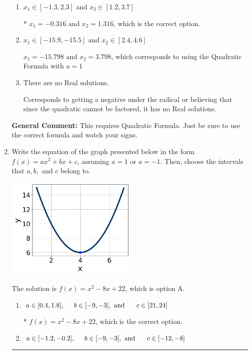 \documentclass{extbook}[14pt]
\newcommand{\litem}[1]{\item #1

\rule{\textwidth}{0.4pt}}
\begin{document}
\begin{enumerate}
{\begin{enumerate}[label=\Alph*.]
 $x_1 = -19.096 \text{ and } x_2 = 20.096$, which corresponds to writing the Quadratic Formula as $-\frac{b}{2a} \pm \sqrt{b^2 - 4ac}$.
\item \( x_1 \in [-1.3, 2.3] \text{ and } x_2 \in [1.2, 3.7] \)

* $x_1 = -0.316 \text{ and } x_2 = 1.316$, which is the correct option.
\item \( x_1 \in [-15.9, -15.5] \text{ and } x_2 \in [2.4, 4.6] \)

 $x_1 = -15.798 \text{ and } x_2 = 3.798$, which corresponds to using the Quadratic Formula with $a=1$
\item \( \text{There are no Real solutions.} \)

Corresponds to getting a negative under the radical or believing that since the quadratic cannot be factored, it has no Real solutions.
\end{enumerate}

\textbf{General Comment:} This requires Quadratic Formula. Just be sure to use the correct formula and watch your signs.
}
\litem{
Write the equation of the graph presented below in the form $f(x)=ax^2+bx+c$, assuming  $a=1$ or $a=-1$. Then, choose the intervals that $a, b,$ and $c$ belong to.

\begin{center}
    \includegraphics[width=0.5\textwidth]{../Figures/quadraticGraphToEquationC.png}
\end{center}


The solution is \( f(x) = x^{2} -8 x + 22 \), which is option A.\begin{enumerate}[label=\Alph*.]
\item \( a \in [0.4, 1.8], \hspace*{5mm} b \in [-9, -3], \text{ and } \hspace*{5mm} c \in [21, 24] \)

* $f(x)=x^{2} -8 x + 22$, which is the correct option.
\item \( a \in [-1.2, -0.2], \hspace*{5mm} b \in [-9, -3], \text{ and } \hspace*{5mm} c \in [-12, -8] \)


\end{enumerate}}
\end{enumerate}
\end{document}
